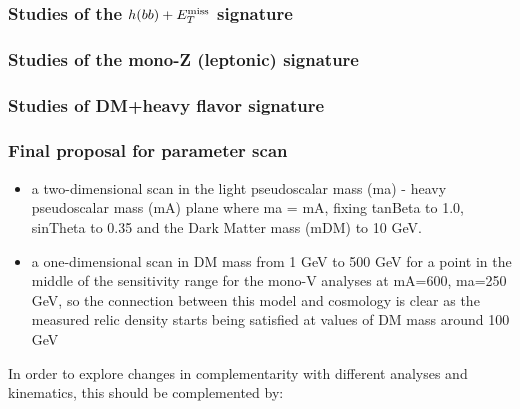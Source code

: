 \subsubsection{Studies of the $h(bb)+E_T^\mathrm{miss}$ signature}


\subsubsection{Studies of the mono-Z (leptonic) signature}


\subsubsection{Studies of DM+heavy flavor signature}



\subsubsection{Final proposal for parameter scan}

\begin{itemize}

\item a two-dimensional scan in the light pseudoscalar mass (ma) -
heavy pseudoscalar mass (mA) plane where ma = mA, fixing tanBeta to 1.0,
sinTheta to 0.35 and the Dark Matter mass (mDM) to 10 GeV.


\item a one-dimensional scan in DM mass from 1 GeV to 500 GeV for a
point in the middle of the sensitivity range for the mono-V analyses at
mA=600, ma=250 GeV, so the connection between this model and cosmology
is clear as the measured relic density starts being satisfied at values
of DM mass around 100 GeV

\end{itemize}


In order to explore changes in complementarity with different
analyses and kinematics, this should be complemented by:

